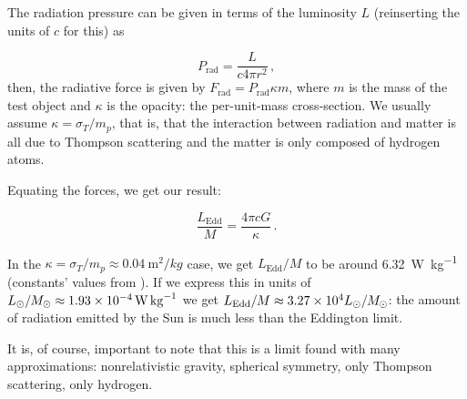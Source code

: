 \documentclass[main.tex]{subfiles}
\begin{document}
The radiation pressure can be given in terms of the luminosity \(L\) (reinserting the units of \(c\) for this) as

\begin{equation}
  P_{\text{rad}} = \frac{L}{c 4 \pi r^2}\,,
\end{equation}
then, the radiative force is given by \(F_{\text{rad}} =  P_{\text{rad}} \kappa m\), where \(m\) is the mass of the test object and \(\kappa\) is the opacity: the per-unit-mass cross-section. We usually assume \(\kappa = \sigma_T/m_p\), that is, that the interaction between radiation and matter is all due to Thompson scattering and the matter is only composed of hydrogen atoms.

Equating the forces, we get our result:

\begin{equation}
 \frac{L_{\text{Edd}}}{M} = \frac{4 \pi c G}{\kappa}\,.
\end{equation}

In the \(\kappa = \sigma_T / m_p \approx \SI{0.04}{\metre^2 / kg}\) case, we get \(L_{\text{Edd}} / M\) to be around \SI{6.32}{\watt\per\kilo\gram} (constants' values from \cite[]{NISTReccomendedConstants:2018}).
If we express this in units of \(L_{\odot} / M_{\odot} \approx \SI{1.93E-04}{\watt\per\kilo\gram}\) \cite[]{SunFactSheet:2018} we get \(L_{\text{Edd}} / M \approx  \num{3.27E+04} L_{\odot} / M_{\odot}\):
the amount of radiation emitted by the Sun is much less than the Eddington limit.

It is, of course, important to note that this is a limit found with many approximations: nonrelativistic gravity, spherical symmetry, only Thompson scattering, only hydrogen.
\end{document}
